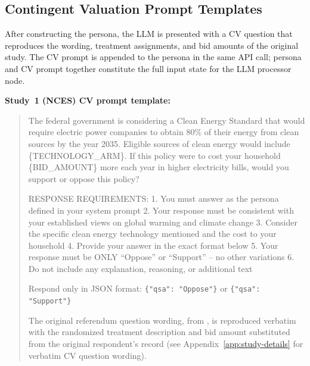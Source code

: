 \documentclass[12pt]{article}
\begin{document}
\subsection{Contingent Valuation Prompt Templates}\label{app:platform-prompts}

After constructing the persona, the LLM is presented with a CV question that reproduces the wording, treatment assignments, and bid amounts of the original study. The CV prompt is appended to the persona in the same API call; persona and CV prompt together constitute the full input state for the LLM processor node.

\medskip\noindent\textbf{Study~1 (NCES) CV prompt template:}
\begin{quote}
The federal government is considering a Clean Energy Standard that would require electric power companies to obtain 80\% of their energy from clean sources by the year 2035. Eligible sources of clean energy would include \{TECHNOLOGY\_ARM\}. If this policy were to cost your household \{BID\_AMOUNT\} more each year in higher electricity bills, would you support or oppose this policy?

RESPONSE REQUIREMENTS:
1. You must answer as the persona defined in your system prompt
2. Your response must be consistent with your established views on global warming and climate change
3. Consider the specific clean energy technology mentioned and the cost to your household
4. Provide your answer in the exact format below
5. Your response must be ONLY ``Oppose'' or ``Support'' -- no other variations
6. Do not include any explanation, reasoning, or additional text

Respond only in JSON format: \texttt{\{"qsa": "Oppose"\}} or \texttt{\{"qsa": "Support"\}}

\smallskip The original referendum question wording, from \citet{Aldy2012}, is reproduced verbatim with the randomized treatment description and bid amount substituted from the original respondent's record (see Appendix~\ref{app:study-details} for verbatim CV question wording).
\end{quote}
\end{document}
